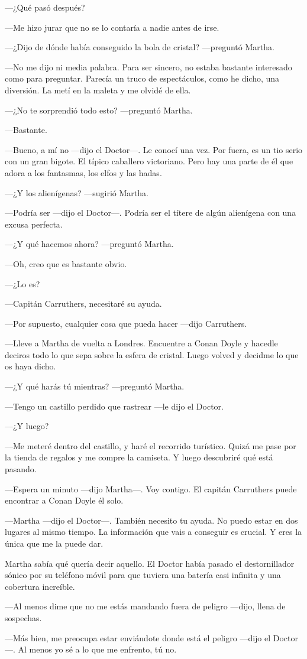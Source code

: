 ---¿Qué pasó después?

---Me hizo jurar que no se lo contaría a nadie antes de irse.

---¿Dijo de dónde había conseguido la bola de cristal? ---preguntó
Martha.

---No me dijo ni media palabra. Para ser sincero, no estaba bastante
interesado como para preguntar. Parecía un truco de espectáculos, como
he dicho, una diversión. La metí en la maleta y me olvidé de ella.

---¿No te sorprendió todo esto? ---preguntó Martha.

---Bastante.

---Bueno, a mí no ---dijo el Doctor---. Le conocí una vez. Por fuera, es
un tio serio con un gran bigote. El típico caballero victoriano. Pero
hay una parte de él que adora a los fantasmas, los elfos y las hadas.

---¿Y los alienígenas? ---sugirió Martha.

---Podría ser ---dijo el Doctor---. Podría ser el títere de algún
alienígena con una excusa perfecta.

---¿Y qué hacemos ahora? ---preguntó Martha.

---Oh, creo que es bastante obvio.

---¿Lo es?

---Capitán Carruthers, necesitaré su ayuda.

---Por supuesto, cualquier cosa que pueda hacer ---dijo Carruthers.

---Lleve a Martha de vuelta a Londres. Encuentre a Conan Doyle y hacedle
deciros todo lo que sepa sobre la esfera de cristal. Luego volved y
decidme lo que os haya dicho.

---¿Y qué harás tú mientras? ---preguntó Martha.

---Tengo un castillo perdido que rastrear ---le dijo el Doctor.

---¿Y luego?

---Me meteré dentro del castillo, y haré el recorrido turístico. Quizá
me pase por la tienda de regalos y me compre la camiseta. Y luego
descubriré qué está pasando.

---Espera un minuto ---dijo Martha---. Voy contigo. El capitán
Carruthers puede encontrar a Conan Doyle él solo.

---Martha ---dijo el Doctor---. También necesito tu ayuda. No puedo
estar en dos lugares al mismo tiempo. La información que vais a
conseguir es crucial. Y eres la única que me la puede dar.

Martha sabía qué quería decir aquello. El Doctor había pasado el
destornillador sónico por su teléfono móvil para que tuviera una batería
casi infinita y una cobertura increíble.

---Al menos dime que no me estás mandando fuera de peligro ---dijo,
llena de sospechas.

---Más bien, me preocupa estar enviándote donde está el peligro ---dijo
el Doctor---. Al menos yo sé a lo que me enfrento, tú no.